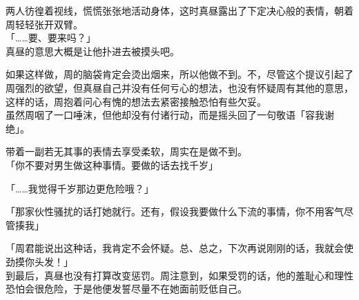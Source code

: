两人彷徨着视线，慌慌张张地活动身体，这时真昼露出了下定决心般的表情，朝着周轻轻张开双臂。\\

「……要、要来吗？」\\

真昼的意思大概是让他扑进去被摸头吧。

如果这样做，周的脑袋肯定会烫出烟来，所以他做不到。不，尽管这个提议引起了周强烈的欲望，但真昼自己并没有任何亏心的想法，也没有怀疑周有其他的意思，这样的话，周抱着问心有愧的想法去紧密接触恐怕有些欠妥。\\

虽然周咽了一口唾沫，但他却没有付诸行动，而是摇头回了一句敬语「容我谢绝」。

带着一副若无其事的表情去享受柔软，周实在是做不到。\\

「你不要对男生做这种事情。要做的话去找千岁」

「……我觉得千岁那边更危险哦？」

「那家伙性骚扰的话打她就行。还有，假设我要做什么下流的事情，你不用客气尽管揍我」

「周君能说出这种话，我肯定不会怀疑。总、总之，下次再说刚刚的话，我就会使劲摸你头发！」\\

到最后，真昼也没有打算改变惩罚。周注意到，如果受罚的话，他的羞耻心和理性恐怕会很危险，于是他便发誓尽量不在她面前贬低自己。
